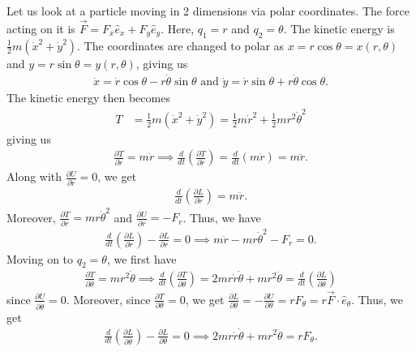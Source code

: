 \begin{example}
    Let us look at a particle moving in 2 dimensions via polar coordinates. The force acting on it is $\vec{F} = F_{x}\hat{e}_{x} + F_{y}\hat{e}_{y}$. Here, $q_{1} = r$ and $q_{2} = \theta$. The kinetic energy is $\frac{1}{2}m(\dot{x}^{2}+\dot{y}^{2})$. The coordinates are changed to polar as $x = r\cos\theta = x(r,\theta)$ and $y = r \sin \theta = y(r,\theta)$, giving us
    \begin{align}
        \dot{x} = \dot{r} \cos \theta - r \dot{\theta} \sin \theta \text{ and } \dot{y} = \dot{r} \sin \theta + r \dot{\theta} \cos \theta.
    \end{align}
    The kinetic energy then becomes
    \begin{align}
        T &= \frac{1}{2} m(\dot{x}^{2}+\dot{y}^{2}) = \frac{1}{2}m\dot{r}^{2} + \frac{1}{2} mr^{2}\dot{\theta}^{2}
    \end{align}
    giving us
    \begin{align}
        \frac{\partial T}{\partial \dot{r}} = m\dot{r} \implies \frac{d}{dt} \left( \frac{\partial T}{\partial \dot{r}} \right) = \frac{d}{dt} (m\dot{r}) = m\ddot{r}.
    \end{align}
    Along with $\frac{\partial U}{\partial \dot{r}} = 0$, we get
    \begin{align}
        \frac{d}{dt} \left( \frac{\partial L}{\partial \dot{r}} \right) = m\ddot{r}.
    \end{align}
    Moreover, $\frac{\partial T}{\partial r} = mr \dot{\theta}^{2}$ and $\frac{\partial U}{\partial r} = -F_{r}$. Thus, we have
    \begin{align}
        \frac{d}{dt}\left( \frac{\partial L}{\partial \dot{r}} \right) - \frac{\partial L}{\partial r} = 0 \implies m\ddot{r} - mr\dot{\theta}^{2} - F_{r} = 0.
    \end{align}
    Moving on to $q_{2} = \theta$, we first have
    \begin{align}
        \frac{\partial T}{\partial \dot{\theta}} = mr^{2}\dot{\theta} \implies \frac{d}{dt} \left( \frac{\partial T}{\partial \dot{\theta}} \right) = 2mr\dot{r}\dot{\theta} + mr^{2}\ddot{\theta} = \frac{d}{dt} \left( \frac{\partial L}{\partial \dot{\theta}} \right)
    \end{align}
    since $\frac{\partial U}{\partial \dot{\theta}} = 0$. Moreover, since $\frac{\partial T}{\partial \theta} = 0$, we get $\frac{\partial L}{\partial \theta} = -\frac{\partial U}{\partial \theta} = rF_{\theta} = r \vec{F} \cdot \hat{e}_{\theta}$. Thus, we get
    \begin{align}
        \frac{d}{dt}\left( \frac{\partial L}{\partial \dot{\theta}} \right) - \frac{\partial L}{\partial \theta} = 0 \implies 2mr\dot{r}\dot{\theta} + mr^{2}\ddot{\theta} = rF_{\theta}.
    \end{align}
\end{example}

